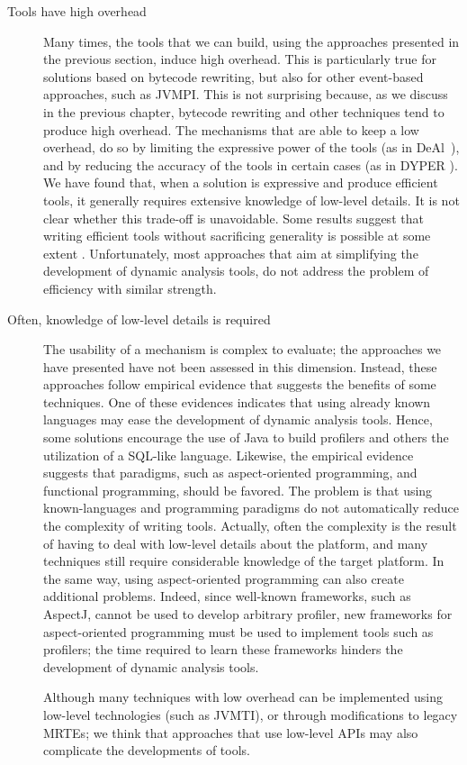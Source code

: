 \begin{description}
\item[Tools have high overhead]
Many times, the tools that we can build, using the approaches presented in the previous section, induce high overhead.
This is particularly true for solutions based on bytecode rewriting, but also for other event-based approaches, such as JVMPI.
This is not surprising because, as we discuss in the previous chapter, bytecode rewriting and other techniques tend to produce high overhead.
The mechanisms that are able to keep a low overhead, do so by limiting the expressive power of the tools (as in DeAl~\cite{Reichenbach:2010:GCE:1869459.1869482}), and by reducing the accuracy of the tools in certain cases (as in DYPER \cite{Reiss:2008:CDP:1383559.1383566}). 
We have found that, when a solution is expressive and produce efficient tools, it generally requires extensive knowledge of low-level details.
It is not clear whether this trade-off is unavoidable.
Some results suggest that writing efficient tools without sacrificing generality is possible at some extent \cite{Reiss:2008:CDP:1383559.1383566}.
Unfortunately, most approaches that aim at simplifying the development of dynamic analysis tools, do not address the problem of efficiency with similar strength.


\item[Often, knowledge of low-level details is required] 
The usability of a mechanism is complex to evaluate; the approaches we have presented have not been assessed in this dimension.
Instead, these approaches follow empirical evidence that suggests the benefits of some techniques.
One of these evidences indicates that using already known languages may ease the development of dynamic analysis tools.
Hence, some solutions encourage the use of Java to build profilers and others the utilization of a SQL-like language.
Likewise, the empirical evidence suggests that paradigms, such as aspect-oriented programming, and functional programming, should be favored.
The problem is that using known-languages and programming paradigms do not automatically reduce the complexity of writing tools.
Actually, often the complexity is the result of having to deal with low-level details about the platform,
and many techniques still require considerable knowledge of the target platform.
In the same way, using aspect-oriented programming can also create additional problems.
Indeed, since well-known frameworks, such as AspectJ, cannot be used to develop arbitrary profiler, new frameworks for aspect-oriented programming must be used to implement tools such as profilers; the time required to learn these frameworks hinders the development of dynamic analysis tools.

Although many techniques with low overhead can be implemented using low-level technologies (such as JVMTI), or through modifications to legacy MRTEs; 
we think that approaches that use low-level APIs may also complicate the developments of tools.
 
\end{description}

